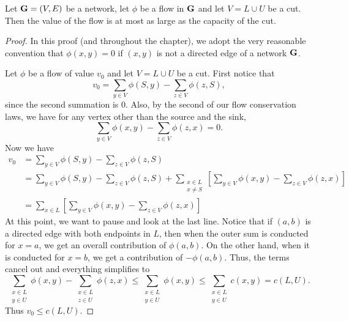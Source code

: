 \begin{theorem}\label{thm:networkflow:flowleqcut}
Let $\mathbf{G}=(V,E)$ be a network, let $\phi$ be a flow in $\mathbf{G}$ and let 
$V=L\cup U$ be a cut. Then the value of the flow is at most as
large as the capacity of the cut.
\end{theorem}
\begin{proof}
  In this proof (and throughout the chapter), we adopt the very
  reasonable convention that $\phi(x,y)=0$ if $(x,y)$ is not a
  directed edge of a network $\mathbf{G}$. 

  Let $\phi$ be a flow of value $v_0$ and let $V=L\cup U$ be a
  cut. First notice that
  \[v_0 = \sum_{y\in V} \phi(S,y) - \sum_{z\in V}\phi(z,S),\]
  since the second summation is $0$. Also, by the second of our flow
  conservation laws, we have for any vertex other than the source and
  the sink,
  \[\sum_{y\in V}\phi(x,y) -\sum_{z\in V}\phi(z,x) = 0.\]
  Now we have
  \begin{align*}
    v_0 &= \sum_{y\in V} \phi(S,y) - \sum_{z\in V}\phi(z,S)\\
    &= \sum_{y\in V} \phi(S,y) - \sum_{z\in V}\phi(z,S) +
    \sum_{\substack{x\in L\\x\neq S}}\left[\sum_{y\in V} \phi(x,y) -
      \sum_{z\in V}\phi(z,x)\right]\\
    &= \sum_{x\in L}\left[\sum_{y\in V} \phi(x,y) -
      \sum_{z\in V}\phi(z,x)\right]
  \end{align*}
  At this point, we want to pause and look at the last line. Notice
  that if $(a,b)$ is a directed edge with both endpoints in $L$, then
  when the outer sum is conducted for $x=a$, we get an overall
  contribution of $\phi(a,b)$. On the other hand, when it is conducted
  for $x=b$, we get a contribution of $-\phi(a,b)$. Thus, the terms
  cancel out and everything simplifies to
  \[\sum_{\substack{x\in L\\y\in U}} \phi(x,y) - \sum_{\substack{x\in
      L\\ z\in U}} \phi(z,x)\leq \sum_{\substack{x\in L\\y\in U}}
  \phi(x,y)\leq \sum_{\substack{x\in L\\y\in U}} c(x,y)=c(L,U).\]
  Thus $v_0\leq c(L,U)$.
\end{proof}

